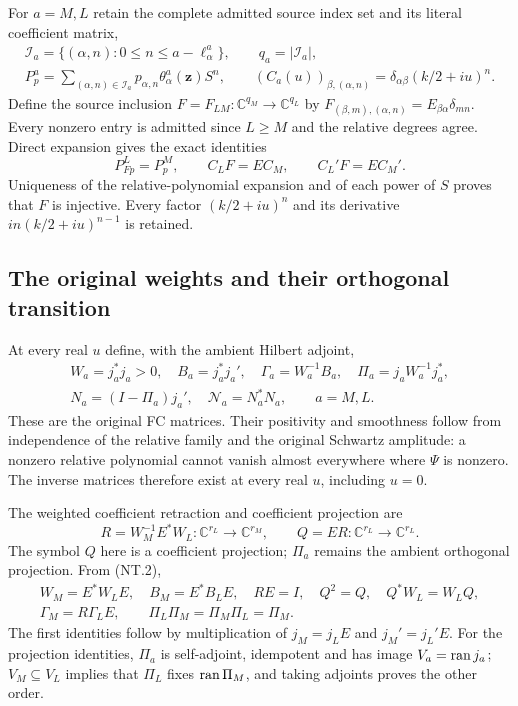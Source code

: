 For $a=M,L$ retain the complete admitted source index set and its
literal coefficient matrix,
\[
 \begin{gathered}
 \mathcal I_a=\{(\alpha,n):0\le n\le a-\ell^a_\alpha\},\qquad
 q_a=|\mathcal I_a|,\\
 P^a_p=\sum_{(\alpha,n)\in\mathcal I_a}
                  p_{\alpha,n}\theta^a_\alpha(\mathbf z)S^n,\qquad
 (C_a(u))_{\beta,(\alpha,n)}
       =\delta_{\alpha\beta}(k/2+iu)^n.
 \end{gathered}
 \tag{NT.3}
\]
Define the source inclusion $F=F_{LM}:\mathbb C^{q_M}\to
\mathbb C^{q_L}$ by
$F_{(\beta,m),(\alpha,n)}=E_{\beta\alpha}\delta_{mn}$.
Every nonzero entry is admitted since $L\ge M$ and the relative
degrees agree. Direct expansion gives the exact identities
\[
 P^L_{Fp}=P^M_p,\qquad C_LF=EC_M,\qquad C_L'F=EC_M'.
 \tag{NT.4}
\]
Uniqueness of the relative-polynomial expansion and of each power of
$S$ proves that $F$ is injective. Every factor $(k/2+iu)^n$ and
its derivative $in(k/2+iu)^{n-1}$ is retained.

\subsection{The original weights and their orthogonal transition}

At every real $u$ define, with the ambient Hilbert adjoint,
\[
 \begin{gathered}
 W_a=j_a^*j_a>0,\quad B_a=j_a^*j_a',\quad
 \Gamma_a=W_a^{-1}B_a,\quad
 \Pi_a=j_aW_a^{-1}j_a^*,\\
 N_a=(I-\Pi_a)j_a',\quad \mathcal N_a=N_a^*N_a,
 \qquad a=M,L.
 \end{gathered}
 \tag{NT.5}
\]
These are the original FC matrices. Their positivity and smoothness
follow from independence of the relative family and the original
Schwartz amplitude: a nonzero relative polynomial cannot vanish
almost everywhere where $\Psi$ is nonzero. The inverse matrices
therefore exist at every real $u$, including $u=0$.

The weighted coefficient retraction and coefficient projection are
\[
 R=W_M^{-1}E^*W_L:\mathbb C^{r_L}\to\mathbb C^{r_M},\qquad
 Q=ER:\mathbb C^{r_L}\to\mathbb C^{r_L}.
 \tag{NT.6}
\]
The symbol $Q$ here is a coefficient projection; $\Pi_a$ remains
the ambient orthogonal projection. From (NT.2),
\[
 \begin{gathered}
 W_M=E^*W_LE,\quad B_M=E^*B_LE,\quad
 R E=I,\quad Q^2=Q,\quad Q^*W_L=W_LQ,\\
 \Gamma_M=R\Gamma_LE,\qquad
 \Pi_L\Pi_M=\Pi_M\Pi_L=\Pi_M.
 \end{gathered}
 \tag{NT.7}
\]
The first identities follow by multiplication of $j_M=j_LE$ and
$j_M'=j_L'E$. For the projection identities, $\Pi_a$ is
self-adjoint, idempotent and has image $V_a=\operatorname{ran} j_a$;
$V_M\subseteq V_L$ implies that $\Pi_L$ fixes $\operatorname{ran}\Pi_M$,
and taking adjoints proves the other order.

